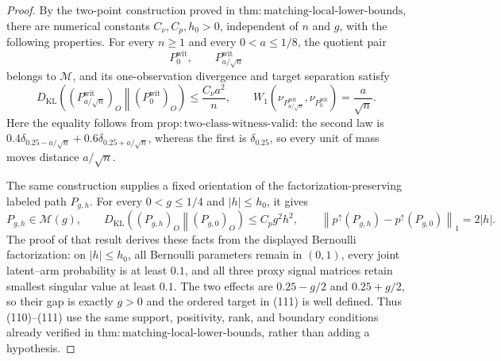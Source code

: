 \documentclass{article}
\begin{document}
\begin{proof}
By the two-point construction proved in \(\mathrm{thm:matching\text{-}local\text{-}lower\text{-}bounds}\), there are numerical constants \(C_{\nu},C_p,h_0>0\), independent of \(n\) and \(g\), with the following properties.  For every \(n\ge 1\) and every \(0<a\le 1/8\), the quotient pair
\[
P_0^{\mathrm{wit}},\qquad P_{a/\sqrt n}^{\mathrm{wit}}
\]
belongs to \(\mathcal M\), and its one-observation divergence and target separation satisfy
\[
D_{\mathrm{KL}}\!\left((P_{a/\sqrt n}^{\mathrm{wit}})_O
 \middle\Vert (P_0^{\mathrm{wit}})_O\right)
 \le \frac{C_{\nu}a^2}{n},
\qquad
W_1\!\left(\nu_{P_{a/\sqrt n}^{\mathrm{wit}}},
             \nu_{P_0^{\mathrm{wit}}}\right)
=\frac a{\sqrt n}.                                                     \tag{110}
\]
Here the equality follows from \(\mathrm{prop:two\text{-}class\text{-}witness\text{-}valid}\): the second law is \(0.4\delta_{0.25-a/\sqrt n}+0.6\delta_{0.25+a/\sqrt n}\), whereas the first is \(\delta_{0.25}\), so every unit of mass moves distance \(a/\sqrt n\).

The same construction supplies a fixed orientation of the factorization-preserving labeled path \(P_{g,h}\).  For every \(0<g\le 1/4\) and \(|h|\le h_0\), it gives
\[
P_{g,h}\in\mathcal M(g),
\qquad
D_{\mathrm{KL}}\!\left((P_{g,h})_O\middle\Vert(P_{g,0})_O\right)
 \le C_p g^2h^2,
\qquad
\left\|p^{\uparrow}(P_{g,h})-p^{\uparrow}(P_{g,0})\right\|_1=2|h|.     \tag{111}
\]
The proof of that result derives these facts from the displayed Bernoulli factorization: on \(|h|\le h_0\), all Bernoulli parameters remain in \((0,1)\), every joint latent--arm probability is at least \(0.1\), and all three proxy signal matrices retain smallest singular value at least \(0.1\).  The two effects are \(0.25-g/2\) and \(0.25+g/2\), so their gap is exactly \(g>0\) and the ordered target in (111) is well defined.  Thus (110)--(111) use the same support, positivity, rank, and boundary conditions already verified in \(\mathrm{thm:matching\text{-}local\text{-}lower\text{-}bounds}\), rather than adding a hypothesis.


\end{proof}
\end{document}
